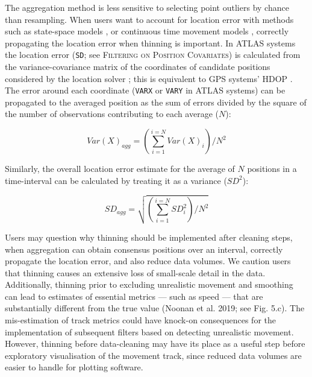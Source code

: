 \documentclass[10pt,paper=a4,headings=standardclasses
]{scrartcl}
\begin{document}
The aggregation method is less sensitive to selecting point outliers by chance than resampling.
When users want to account for location error with methods such as state-space models \citep{jonsen2003, jonsen2005, johnson2008}, or continuous time movement models \citep{fleming2014a, noonan2019, gurarie2017, calabrese2016, fleming2020}, correctly propagating the location error when thinning is important.
In ATLAS systems the location error (\texttt{SD}; see \textsc{Filtering on Position Covariates}) is calculated from the variance-covariance matrix of the coordinates of candidate positions considered by the location solver \citep{weiser2016}; this is equivalent to GPS systems' HDOP \citep{ranacher2016}.
The error around each coordinate (\texttt{VARX} or \texttt{VARY} in ATLAS systems) can be propagated to the averaged position as the sum of errors divided by the square of the number of observations contributing to each average ($N$):
\begin{linenomath*}
    \begin{equation*}
        Var(X)_{agg} = \left( \sum_{i=1}^{i=N} Var(X)_i \right) / N ^ 2
    \end{equation*}
\end{linenomath*}
Similarly, the overall location error estimate for the average of $N$ positions in a time-interval can be calculated by treating it as a variance ($SD ^ 2$):
\begin{linenomath*}
    \begin{equation*}
        SD_{agg} = \sqrt{ \left( \sum_{i=1}^{i=N} SD_i^2 \right) / N ^ 2  }
    \end{equation*}    
\end{linenomath*}

Users may question why thinning should be implemented after cleaning steps, when aggregation can obtain consensus positions over an interval, correctly propagate the location error, and also reduce data volumes.
We caution users that thinning causes an extensive loss of small-scale detail in the data.
Additionally, thinning prior to excluding unrealistic movement and smoothing can lead to estimates of essential metrics --- such as speed --- that are substantially different from the true value (Noonan et al. 2019; see Fig. 5.c).
The mis-estimation of track metrics could have knock-on consequences for the implementation of subsequent filters based on detecting unrealistic movement.
However, thinning before data-cleaning may have its place as a useful step before exploratory visualisation of the movement track, since reduced data volumes are easier to handle for plotting software.
\end{document}
